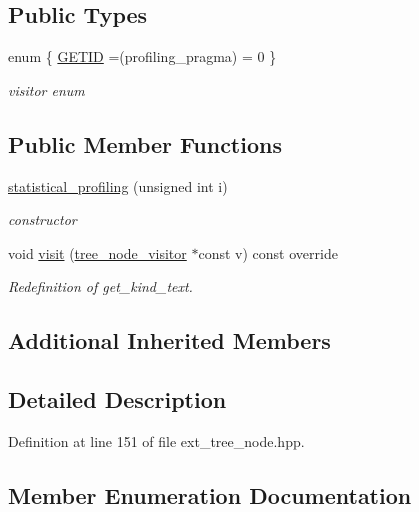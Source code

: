 \subsection*{Public Types}
\begin{DoxyCompactItemize}
\item 
enum \{ \hyperlink{structstatistical__profiling_a6a5c10301aa9c5c966b40e9d41a9538baa4eaa19d0b3e6a7412c34af3ffd6adfe}{G\+E\+T\+ID} =(profiling\+\_\+pragma) = 0
 \}\begin{DoxyCompactList}\small\item\em visitor enum \end{DoxyCompactList}
\end{DoxyCompactItemize}
\subsection*{Public Member Functions}
\begin{DoxyCompactItemize}
\item 
\hyperlink{structstatistical__profiling_a920468964d963c708d02f925039ecc1a}{statistical\+\_\+profiling} (unsigned int i)
\begin{DoxyCompactList}\small\item\em constructor \end{DoxyCompactList}\item 
void \hyperlink{structstatistical__profiling_a5f57274294fc3dc9e32ddeec86c8d3d0}{visit} (\hyperlink{classtree__node__visitor}{tree\+\_\+node\+\_\+visitor} $\ast$const v) const override
\begin{DoxyCompactList}\small\item\em Redefinition of get\+\_\+kind\+\_\+text. \end{DoxyCompactList}\end{DoxyCompactItemize}
\subsection*{Additional Inherited Members}


\subsection{Detailed Description}


Definition at line 151 of file ext\+\_\+tree\+\_\+node.\+hpp.



\subsection{Member Enumeration Documentation}
\mbox{\label{structstatistical__profiling_a6a5c10301aa9c5c966b40e9d41a9538b}} 
